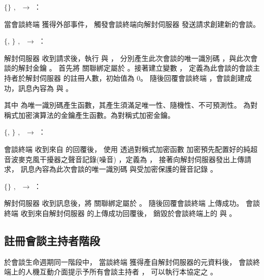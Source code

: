 \begin{pmsgs}
    \item $\{\}$ $,~$ \DEFmeetingbox $\rightarrow$ \DEFserver：

        當會談終端 \DEFmeetingbox 獲得外部事件，
    觸發會談終端向解封伺服器 \DEFserver 發送請求創建新的會談。

    \item $\{$\DEFsessionID, \DEFunsealKey$\}$ $,~$ \DEFserver $\rightarrow$ \DEFmeetingbox：

        解封伺服器 \DEFserver 收到請求後，執行 \DEFfuncIDgen{} 與 \DEFfuncKgen{}，
    分別產生此次會談的唯一識別碼 \DEFsessionID，與此次會談的解封金鑰 \DEFunsealKey。
    首先將 \DEFunsealKey 關聯綁定屬於 \DEFsessionID。接著建立變數 \DEFowreg，
    定義為此會談的會談主持者於解封伺服器 \DEFserver 的註冊人數，初始值為 $0$。
    隨後回覆會談終端 \DEFmeetingbox，會談創建成功，訊息內容為 \DEFsessionID 與 \DEFunsealKey。

        其中 \DEFfuncIDgen{} 為唯一識別碼產生函數，其產生須滿足唯一性、隨機性、不可預測性。
    \DEFfuncKgen{} 為對稱式加密演算法的金鑰產生函數。\DEFunsealKey 為對稱式加密金鑰。

    \item $\{$\DEFsessionID, \DEFrecP$\}$ $,~$ \DEFmeetingbox $\rightarrow$ \DEFserver：

        會談終端 \DEFmeetingbox 收到來自 \DEFserver 的回覆後，
    使用 \DEFunsealKey 透過對稱式加密函數 \DEFfuncEncEK{}
    加密預先配置好的純超音波麥克風干擾器之聲音記錄(噪音) \DEFrecN，定義為 \DEFrecP，
    接著向解封伺服器發出上傳請求，
    訊息內容為此次會談的唯一識別碼 \DEFsessionID 與受加密保護的聲音記錄 \DEFrecP。

    \item $\{\}$ $,~$ \DEFserver $\rightarrow$ \DEFmeetingbox：

        解封伺服器 \DEFserver 收到訊息後，將 \DEFrecP 關聯綁定屬於 \DEFsessionID。
    隨後回覆會談終端 \DEFmeetingbox 上傳成功。
    會談終端 \DEFmeetingbox 收到來自解封伺服器 \DEFserver 的上傳成功回覆後，
    銷毀於會談終端上的 \DEFrecN 與 \DEFunsealKey。
\end{pmsgs}


\subsection{註冊會談主持者階段}\label{subsec:protocol-init-reg}

    於會談生命週期同一階段中，
當談終端 \DEFmeetingbox 獲得產自解封伺服器的元資料後，
會談終端上的人機互動介面提示予所有會談主持者 \DEFownerAll，
可以執行本協定之 。

